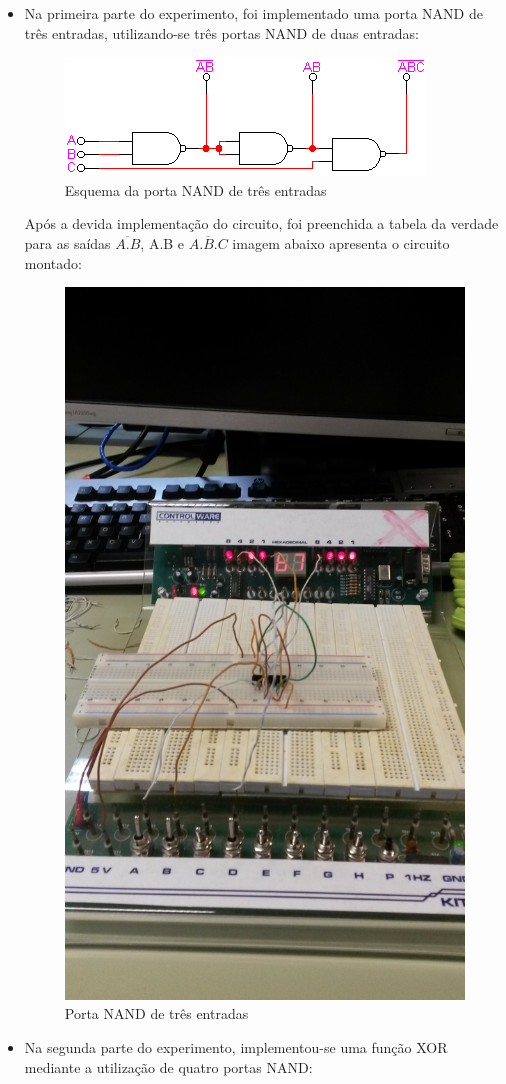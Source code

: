 \documentclass[12pt]{article}
\begin{document}
	\begin{itemize}
		\item Na primeira parte do experimento, foi implementado uma porta NAND de três entradas, utilizando-se três portas NAND de duas entradas:
		
		\begin{figure}[H]
			\centering
			\includegraphics[width=.5\textwidth]{portanand3.jpg}
			\caption{Esquema da porta NAND de três entradas}
			\label{fig:exemplo}
		\end{figure}
		
		Após a devida implementação do circuito, foi preenchida a tabela da verdade para as saídas 
		$\overline{A.B}$, A.B e $\overline{A.B.C}$ imagem abaixo apresenta o circuito montado:
		
		\begin{figure}[H]
			\centering
			\includegraphics[width=.5\textwidth]{circuitonand.jpg}
			\caption{Porta NAND de três entradas}
			\label{fig:exemplo}
		\end{figure}
		
		\item Na segunda parte do experimento, implementou-se uma função XOR mediante a utilização de quatro portas NAND:
		

\end{itemize}
\end{document}
